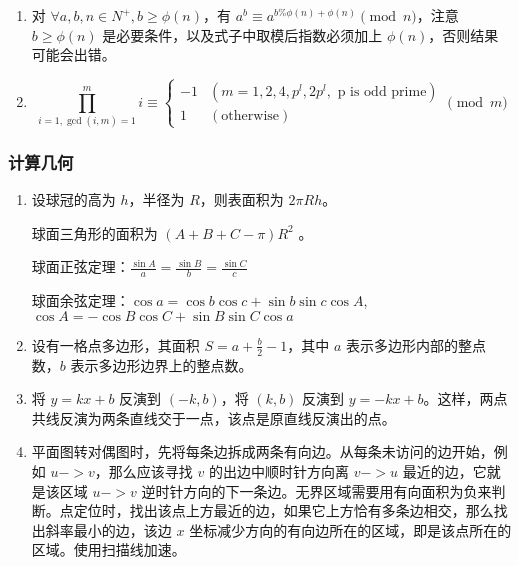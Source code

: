 \begin{enumerate}

\item 对 $\forall a, b, n \in N^{+}, b \ge \phi(n)$，有 $a ^ {b} \equiv a ^ {b \% \phi(n) + \phi(n)}\pmod{n}$，注意 $b \ge \phi(n)$ 是必要条件，以及式子中取模后指数必须加上 $\phi(n)$，否则结果可能会出错。

\item

$$
\prod_{i=1,\gcd(i,m)=1}^{m}i\equiv\begin{cases}
-1&(m=1,2,4,p^{l},2p^{l},\text{ p is odd prime})\\
1&(\text{otherwise})
\end{cases}\pmod{m}
$$

\end{enumerate}

\subsubsection{计算几何}

\begin{enumerate}

\item 设球冠的高为 $h$，半径为 $R$，则表面积为 $2\pi Rh$。

球面三角形的面积为 $(A+B+C-\pi)R^{2}$ 。

球面正弦定理：$\frac{\sin A}{a} = \frac{\sin B}{b} = \frac{\sin C}{c}$

球面余弦定理：$\cos a=\cos b\cos c+\sin b\sin c\cos A$, $\cos A=-\cos B\cos C+\sin B\sin C\cos a$

\item 设有一格点多边形，其面积 $S=a+\frac{b}{2}-1$，其中 $a$ 表示多边形内部的整点数，$b$ 表示多边形边界上的整点数。

\item 将 $y=kx+b$ 反演到 $(-k,b)$，将 $(k,b)$ 反演到 $y=-kx+b$。这样，两点共线反演为两条直线交于一点，该点是原直线反演出的点。

\item 平面图转对偶图时，先将每条边拆成两条有向边。从每条未访问的边开始，例如 $u->v$，那么应该寻找 $v$ 的出边中顺时针方向离 $v->u$ 最近的边，它就是该区域 $u->v$ 逆时针方向的下一条边。无界区域需要用有向面积为负来判断。点定位时，找出该点上方最近的边，如果它上方恰有多条边相交，那么找出斜率最小的边，该边 $x$ 坐标减少方向的有向边所在的区域，即是该点所在的区域。使用扫描线加速。

\end{enumerate}

